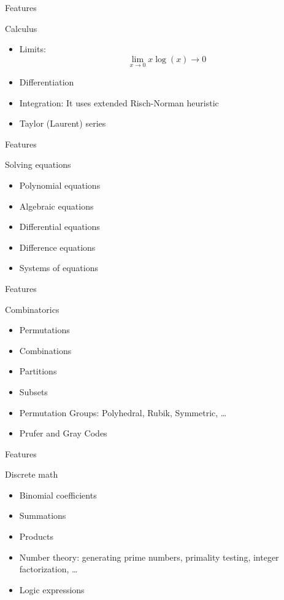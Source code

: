 \documentclass[xcolor=svgnames]{beamer}
\begin{document}
\begin{frame}{Features}
  \begin{block}{Calculus}
    \begin{itemize}
    \item Limits: $$\lim_{x\to 0}{x\log(x)} \rightarrow 0$$
    \item Differentiation
    \item Integration: It uses extended Risch-Norman heuristic
    \item Taylor (Laurent) series
    \end{itemize}
  \end{block}
\end{frame}

\begin{frame}{Features}
  \begin{block}{Solving equations}
    \begin{itemize}
    \item Polynomial equations
    \item Algebraic equations
    \item Differential equations
    \item Difference equations
    \item Systems of equations
    \end{itemize}
  \end{block}
\end{frame}

\begin{frame}{Features}
  \begin{block}{Combinatorics}
    \begin{itemize}
    \item Permutations
    \item Combinations
    \item Partitions
    \item Subsets
    \item Permutation Groups: Polyhedral, Rubik, Symmetric, \ldots
    \item Prufer and Gray Codes
    \end{itemize}
  \end{block}
\end{frame}

\begin{frame}{Features}
  \begin{block}{Discrete math}
    \begin{itemize}
    \item Binomial coefficients
    \item Summations
    \item Products
    \item Number theory: generating prime numbers, primality testing, integer
      factorization, \ldots
    \item Logic expressions
    \end{itemize}
  \end{block}
\end{frame}
\end{document}
